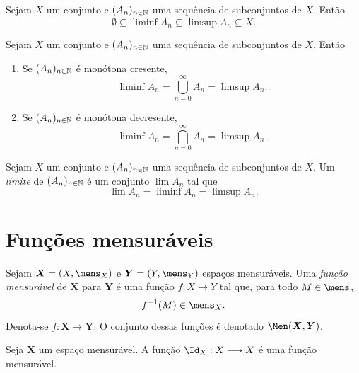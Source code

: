 \begin{prop}
	Sejam $X$ um conjunto e $(A_n)_{n \in \mathbb{N}}$ uma sequência de subconjuntos de $X$. Então
	\begin{equation*}
	\emptyset \subseteq \liminf A_n \subseteq \limsup A_n \subseteq X.
	\end{equation*}
\end{prop}

\begin{prop}
	Sejam $X$ um conjunto e $(A_n)_{n \in \mathbb{N}}$ uma sequência de subconjuntos de $X$. Então
	\begin{enumerate}
	\item Se $(A_n)_{n \in \mathbb{N}}$ é monótona cresente,
	\begin{equation*}
	\liminf A_n = \bigcup_{n=0}^\infty A_n = \limsup A_n.
	\end{equation*}
	
	\item Se $(A_n)_{n \in \mathbb{N}}$ é monótona decresente,
	\begin{equation*}
	\liminf A_n = \bigcap_{n=0}^\infty A_n = \limsup A_n.
	\end{equation*}
	\end{enumerate}
\end{prop}

\begin{defi}
	Sejam $X$ um conjunto e $(A_n)_{n \in \mathbb{N}}$ uma sequência de subconjuntos de $X$. Um \emph{limite} de $(A_n)_{n \in \mathbb{N}}$ é um conjunto $\lim A_n$ tal que
	\begin{equation*}
	\lim A_n = \liminf A_n = \limsup A_n.
	\end{equation*}
\end{defi}


\section{Funções mensuráveis}

\begin{defi}
Sejam $\bm X = (X,\mens_X)$ e $\bm Y = (Y,\mens_Y)$ espaços mensuráveis. Uma \emph{função mensurável} de $\bm X$ para $\bm Y$ é uma função $f\colon X \to Y$ tal que, para todo $M \in \mens$,
	\begin{equation*}
	f\inv(M) \in \mens_X.
	\end{equation*}
Denota-se $f\colon \bm X \to \bm Y$. O conjunto dessas funções é denotado $\Men(\bm X, \bm Y)$.
\end{defi}

\begin{prop}
Seja $\bm X$ um espaço mensurável. A função $\Id_X: X \to X$ é uma função mensurável.
\end{prop}

